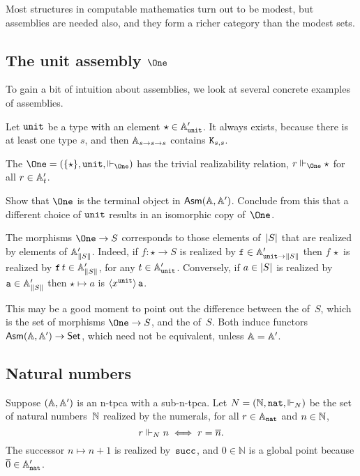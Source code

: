 Most structures in computable mathematics turn out to be modest, but assemblies are needed also, and they form a richer category than the modest sets.

\subsection{The unit assembly $\One$}
\label{sec:asm-unit}

To gain a bit of intuition about assemblies, we look at several concrete examples of assemblies.

Let $\unit$ be a type with an element $\ttunit \in \subAtyp{\unit}$.
It always exists, because there is at least one type $s$, and then
$\Atyp{s \to s \to s}$ contains $\combK_{s,s}$.

The  $\One = (\set{\star}, \unit, {\rz[\One]})$ has the trivial realizability relation, $r \rz[\One] \star$ for all $r \in \subAtyp{t}$.

\begin{exercise}
  Show that $\One$ is the terminal object
  in $\AsmA$. Conclude from this that a different choice of $\unit$ results in an isomorphic copy of~$\One$.
\end{exercise}

The morphisms $\One \to S$ corresponds to those elements of~$\S{S}$ that are realized by elements of $\subAtyp{\T{S}}$. Indeed, if $f : \star \to S$ is realized by $\R{f} \in \subAtyp{\unit \to \T{S}}$ then $f \, \star$ is realized by $\R{f} \, t \in \subAtyp{\T{S}}$, for any $t \in \subAtyp{\unit}$. Conversely, if $a \in \S{S}$ is realized by $\R{a} \in \subAtyp{\T{S}}$ then $\star \mapsto a$ is $\tpcalam{x}{\unit}{\R{a}}$.

This may be a good moment to point out the difference between the  of~$S$, which is the set of morphisms $\One \to S$, and the  of~$S$. Both induce functors $\AsmA \to \Set$, which need not be equivalent, unless $\AA = \subAA$.


\subsection{Natural numbers}
\label{sec:asm-natural-numbers}

Suppose $(\AA, \subAA)$ is an n-tpca with a sub-n-tpca. Let $N = (\NN, \ttnat, {\rz[N]})$ be the set of natural numbers~$\NN$ realized by the numerals, for all $r \in \Atyp{\ttnat}$ and $n \in \NN$,
%
\begin{equation*}
  r \rz[N] n \iff
  r = \overline{n}.
\end{equation*}
%
The successor $n \mapsto n + 1$ is realized by~$\combSucc$, and $0 \in \mathbb{N}$ is a global point because $\numeral{0} \in \subAtyp{\ttnat}$.

